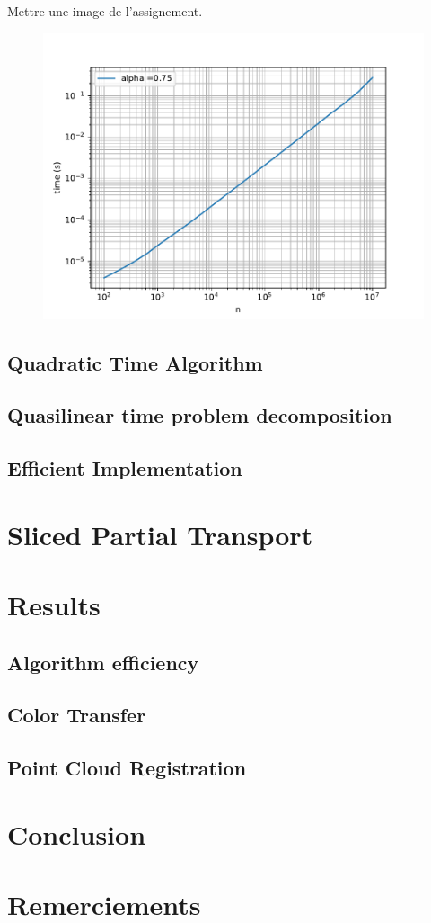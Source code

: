 \documentclass[a4paper,12pt]{article}
\begin{document}
Mettre une image de l'assignement.

\begin{figure}
\includegraphics[width = \columnwidth]{t_time.pdf}
\end{figure}

\subsection{Quadratic Time Algorithm}

\subsection{Quasilinear time problem decomposition}

\subsection{Efficient Implementation}


\section{Sliced Partial Transport}


\section{Results}

\subsection{Algorithm efficiency}

\subsection{Color Transfer}

\subsection{Point Cloud Registration}
        

\bigskip

\section*{Conclusion}


\section*{Remerciements}




\end{document}
